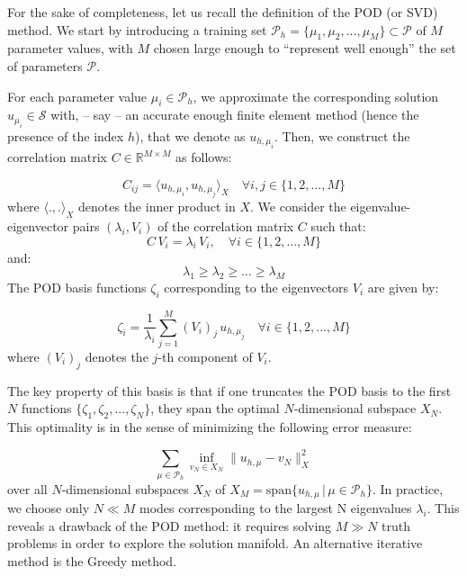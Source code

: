 \documentclass[graybox]{svmult}
\begin{document}
For the sake of completeness, let us recall the definition of the POD (or SVD) method. We start by introducing a  training set ${\mathcal P}_h = \{\mu_1, \mu_2, ..., \mu_M\} \subset {\mathcal P}$ of $M$ parameter values, with $M$ chosen large enough to ``represent well enough'' the set of parameters ${\mathcal P}$. 

For each parameter value $\mu_i \in {\mathcal P}_h$, we approximate the corresponding solution $u_{\mu_i}\in {\mathcal S}$ with, -- say -- an accurate enough finite element method (hence the presence of the index $h$), that we denote as $u_{h,\mu_i}$.
Then, we construct the correlation matrix $C \in \mathbb{R}^{M \times M}$ as follows:

\begin{equation}
  \label{eq:correlationmatrix}
  C_{ij} = \langle u_{h,\mu_i}, u_{h,\mu_j} \rangle_{X} \quad \forall i,j \in \{1,2,...,M\}
\end{equation}
where $\langle .,.\rangle_{X}$ denotes the inner product in $X$.
We consider the eigenvalue-eigenvector pairs $(\lambda_i, V_i)$ of the correlation matrix $C$ such that:
\begin{equation}
  \label{eq:eigenvalueproblem}
  C \, V_i = \lambda_i \, V_i, \quad \forall i \in \{1,2,...,M\}
\end{equation}
and:
\begin{equation}
  \label{eq:eigenvalueorder}
  \lambda_1 \geq \lambda_2 \geq ... \geq \lambda_M
\end{equation}
The POD basis functions $\zeta_i$ corresponding to the eigenvectors  $V_i$ are given by:

\begin{equation}
  \label{eq:PODbasis}
  \zeta_i = \frac{1}{\lambda_i} \sum_{j=1}^{M} (V_{i})_j \, u_{h,\mu_j} \quad \forall i \in \{1,2,...,M\}
\end{equation}
where $(V_{i})_j$ denotes the $j$-th component of $V_i$.

The key property of this basis is that if one truncates the POD basis to the first $N$ functions $\{\zeta_1,\zeta_2, ..., \zeta_N\}$, they span the optimal $N$-dimensional subspace $X_N$. This optimality is in the sense of minimizing the following error measure:

\begin{equation}
  \label{eq:PODerror}
   \sum\limits_{\mu \in {\mathcal P}_h} \inf\limits_{{v_N}\in X_N} \|u_{h,\mu} - v_N\|^2_X
\end{equation}
over all $N$-dimensional subspaces $X_N$ of $X_M= \text{span}\{u_{h,\mu} \, | \, \mu \in {\mathcal P}_h\}$.
In practice, we choose only $N \ll M$ modes corresponding to the largest N eigenvalues $\lambda_i$. This reveals a drawback of the POD method: it requires solving $M\gg N$ truth problems in order to explore the solution manifold. An alternative iterative method is the Greedy method.
\end{document}
